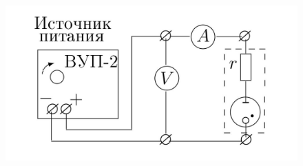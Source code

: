 \documentclass[a4paper,12pt]{article} %
\begin{document}
\begin{figure}[h]
    \centering
    \includegraphics[scale=0.3]{scheme2.jpg}
    \label{tc}
\end{figure}
\end{document}
